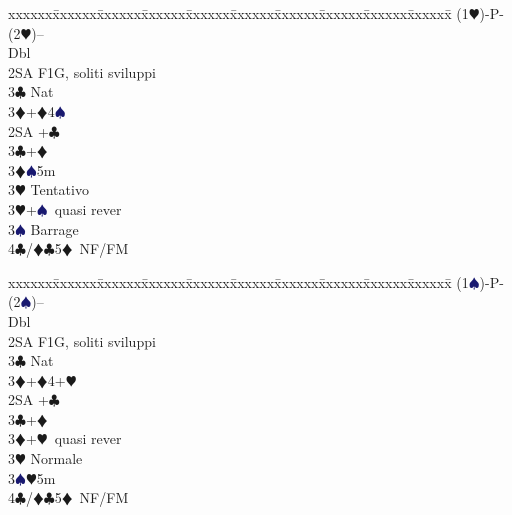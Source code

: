 \documentclass[a4paper,italian]{article}
\newcommand{\BC}{\textcolor{OliveGreen}{$\clubsuit$}}
\newcommand{\BD}{\textcolor{RedOrange}{$\vardiamondsuit$}}
\newcommand{\BH}{\textcolor{Red2}{$\varheartsuit${}}}
\newcommand{\BS}{\textcolor{MidnightBlue}{$\spadesuit${}}}
\newenvironment{bidtable}
{\begin{tabbing}

    xxxxxx\=xxxxxx\=xxxxxx\=xxxxxx\=xxxxxx\=xxxxxx\=xxxxxx\=xxxxxx\=xxxxxx\=xxxxxx\=\kill}
{\end{tabbing} }%
\begin{document}
\begin{multicols}{2}
                                        \begin{bidtable}
                                            (1\BH)-P-(2\BH)--\\
                                            Dbl\+\\
                                            2SA \> F1G, soliti sviluppi\\
                                            3\BC\> Nat\+\\
                                            3\BD {}+\BD4\BS \-\-\\
                                            2SA +\BC \\
                                            3\BC {}+\BD \\
                                            3\BD {}\BS 5m\+\\
                                            3\BH \> Tentativo\-\\
                                            3\BH {}+\BS\ quasi rever\\
                                            3\BS \> Barrage\\
                                            4\BC/\BD {}\BC 5\BD\ NF/FM
                                        \end{bidtable}
                                        \bigbreak
                                        \begin{bidtable}
                                            (1\BS)-P-(2\BS)--\\
                                            Dbl\+\\
                                            2SA \> F1G, soliti sviluppi\\
                                            3\BC\> Nat\+\\
                                            3\BD {}+\BD4+\BH \-\-\\
                                            2SA +\BC \\
                                            3\BC {}+\BD \\
                                            3\BD {}+\BH\ quasi rever\\
                                            3\BH \> Normale\\
                                            3\BS {}\BH 5m\\
                                            4\BC/\BD {}\BC 5\BD\ NF/FM

\end{bidtable}
\end{multicols}
\end{document}
